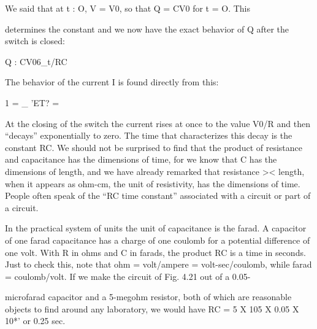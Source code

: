 We said that at t : O, V = V0, so that Q = CV0 for t = O. This

determines the constant and we now have the exact behavior of Q
after the switch is closed:

Q : CV06_t/RC 
\begin{equation}
\end{equation}

The behavior of the current I is found directly from this:

1 = _ 'ET? = %
\begin{equation}
\end{equation}

At the closing of the switch the current rises at once to the value
V0/R and then ``decays'' exponentially to zero. The time that characterizes
this decay is the constant RC. We should not be surprised to
find that the product of resistance and capacitance has the dimensions
of time, for we know that C has the dimensions of length, and
we have already remarked that resistance >< length, when it appears
as ohm-cm, the unit of resistivity, has the dimensions of time. People
often speak of the ``RC time constant'' associated with a circuit or
part of a circuit.

In the practical system of units the unit of capacitance is the farad.
A capacitor of one farad capacitance has a charge of one coulomb
for a potential difference of one volt. With R in ohms and C in
farads, the product RC is a time in seconds. Just to check this,
note that ohm = volt/ampere = volt-sec/coulomb, while farad =
coulomb/volt. If we make the circuit of Fig. 4.21 out of a 0.05-

microfarad capacitor and a 5-megohm resistor, both of which are
reasonable objects to find around any laboratory, we would have
RC = 5 X 105 X 0.05 X 10*' or 0.25 sec.

